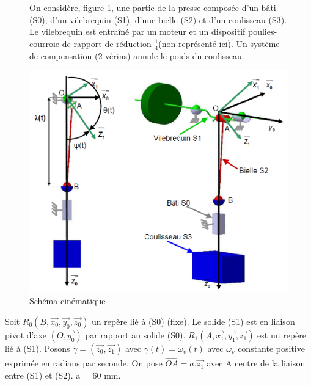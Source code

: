 \begin{figure}[htbp]
\begin{minipage}[c]{.45\linewidth}
On considère, figure \ref{fig:image16}, une partie de la presse composée d'un bâti (S0), d'un vilebrequin (S1), d'une bielle (S2) et d'un coulisseau (S3). Le vilebrequin est entraîné par un moteur et un dispositif \og poulies-courroie \fg de rapport de réduction $\frac{1}{4}$(non représenté ici). Un système de compensation (2 vérins) annule le poids du coulisseau.
\end{minipage}
\hfill
\begin{minipage}[c]{.5\linewidth}
\begin{center}
\includegraphics[width=\linewidth]{img/Poinc_cin2.png}
\caption{Schéma cinématique}
\label{fig:image16}
\end{center}
\end{minipage}
\end{figure}


Soit $R_0(B,\overrightarrow{x_0},\overrightarrow{y_0},\overrightarrow{z_0})$ un repère lié à (S0) (fixe). Le solide (S1) est en liaison pivot d'axe $(O,\overrightarrow{y_0})$ par rapport au solide (S0). $R_1(A,\overrightarrow{x_1},\overrightarrow{y_1},\overrightarrow{z_1})$ est un repère lié à (S1). Posons $\gamma=(\overrightarrow{z_0},\overrightarrow{z_1})$ avec $\dot{\gamma(t)}=\omega_v(t)$ avec $\omega_v$ constante positive exprimée en radians par seconde. On pose $\overrightarrow{OA}=a.\overrightarrow{z_1}$ avec A centre de la liaison entre (S1) et (S2). a = 60 mm.

